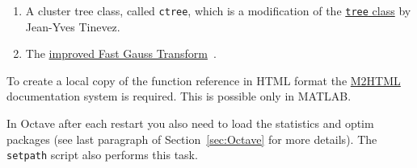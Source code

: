 \documentclass{book}
\begin{document}
\begin{enumerate}

\item A cluster tree class, called {\tt ctree}\/, which is a
modification of the
\href{https://uk.mathworks.com/matlabcentral/fileexchange/35623-tree-data-structure-as-a-matlab-class}
{{\tt tree} class} by
Jean-Yves Tinevez.

\item The
\href{http://www.umiacs.umd.edu/~morariu/figtree/}
{improved Fast Gauss Transform}~\cite{Morariu08}.

\end{enumerate}

\noindent
%
To create a local copy of the function reference in HTML format the
%
\href{https://www.artefact.tk/software/matlab/m2html/}{M2HTML}
%
documentation system is required. This is possible only in MATLAB.



%
%

%

\noindent
%
In Octave after each restart you also need to load the statistics and optim
packages (see last paragraph of Section~\ref{sec:Octave} for more details). 
The {\tt setpath} script also performs this task.
\end{document}
